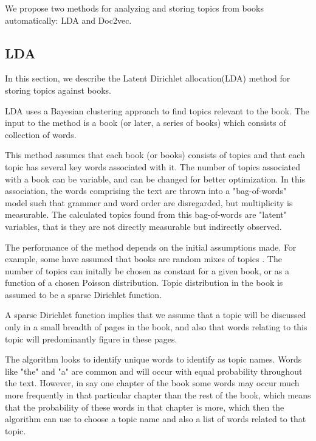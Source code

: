 
We propose two methods for analyzing and storing topics from books automatically: LDA and Doc2vec. 

\subsection{LDA}
\label{sec:lda}
\par In this section, we describe the Latent Dirichlet allocation(LDA) method for storing topics against books. 
\par LDA uses a Bayesian clustering approach to find topics relevant to the book. \cite{RefWorks:doc:5a721fb5e4b0d609eec83aa1} The input to the method is a book (or later, a series of books) which consists of collection of words. 
\par This method assumes that each book (or books) consists of topics and that each topic has several key words associated with it. The number of topics associated with a book can be variable, and can be changed for better optimization. In this association, the words comprising the text are thrown into a "bag-of-words" model such that grammer and word order are disregarded, but multiplicity is measurable. The calculated topics found from this bag-of-words are "latent" variables, that is they are not directly measurable but indirectly observed.  
\par The performance of the method depends on the initial assumptions made. For example, some have assumed that books are random mixes of topics \cite{RefWorks:doc:5a721e4ae4b095066af57410}. The number of topics can initally be chosen as constant for a given book, or as a function of a chosen Poisson distribution. \cite{RefWorks:doc:5a721e4ae4b095066af57410} Topic distribution in the book is assumed to be a sparse Dirichlet function.
\par A sparse Dirichlet function implies that we assume that a topic will be discussed only in a small breadth of pages in the book, and also that words relating to this topic will predominantly figure in these pages.
\par The algorithm looks to identify unique words to identify as topic names. Words like "the" and "a" are common and will occur with equal probability throughout the text. However, in say one chapter of the book some words may occur much more frequently in that particular chapter than the rest of the book, which means that the probability of these words in that chapter is more, which then the algorithm can use to choose a topic name and also a list of words related to that topic.

